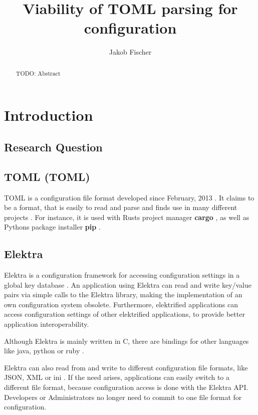 \documentclass[12pt]{report}
\title{Viability of TOML parsing for configuration}
\author{Jakob Fischer}
\begin{document}
\maketitle

\begin{abstract}
TODO: Abstract
\end{abstract}

\chapter{Introduction}

\section{Research Question}

\section{\acrshort{TOML} (\acrlong{TOML})}
\acrshort{TOML} is a configuration file format developed since February, 2013 \cite{tomlcontrib}.
It claims to be a format, that is easily to read and parse \cite{tomlreadme} and finds use in many different projects \cite{tomlwiki}.
For instance, it is used with Rusts project manager \textbf{cargo} \cite{cargogit}, as well as Pythons package installer \textbf{pip} \cite{piprefguide}.

\section{Elektra}
Elektra is a configuration framework for accessing configuration settings in a global key database \cite{elektramain}.
An application using Elektra can read and write key/value pairs via simple calls to the Elektra library, making the implementation of an own configuration system obsolete.
Furthermore, elektrified applications can access configuration settings of other elektrified applications, to provide better application interoperability.

Although Elektra is mainly written in C, there are bindings for other languages like java, python or ruby \cite{elektrabindings}.

Elektra can also read from and write to different configuration file formats, like JSON, XML or ini \cite{elektrastorage}.
If the need arises, applications can easily switch to a different file format, because configuration access is done with the Elektra API.
Developers or Administrators no longer need to commit to one file format for configuration.
\end{document}
